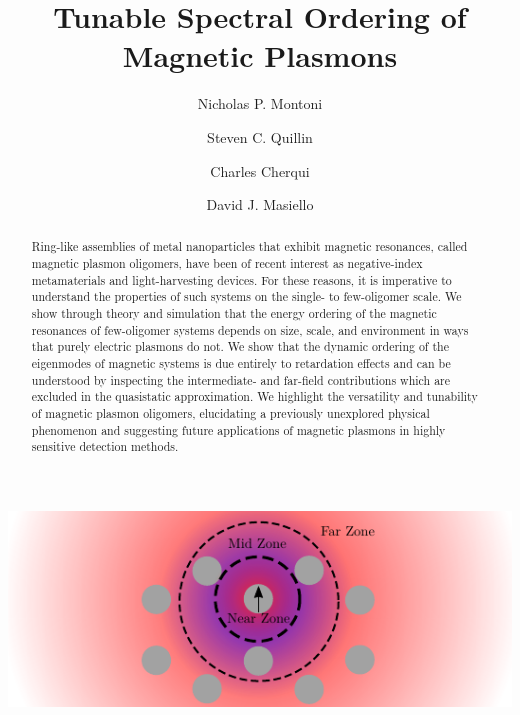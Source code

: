 \documentclass[journal=apchd5,manuscript=article]{achemso}
\author{Nicholas P. Montoni}
\author{Steven C. Quillin}
\author{Charles Cherqui}
\author{David J. Masiello}
\affiliation[Department of Chemistry, University of Washington]
{Department of Chemistry, University of Washington, Seattle, WA 98195}
\title[]
{Tunable Spectral Ordering of Magnetic Plasmons}
\begin{document}
\begin{tocentry}
\includegraphics{toc_graphic.pdf}

\end{tocentry}

\begin{abstract}
Ring-like assemblies of metal nanoparticles that exhibit magnetic resonances, called magnetic plasmon oligomers, have been of recent interest as negative-index metamaterials and light-harvesting devices. For these reasons, it is imperative to understand the properties of such systems on the single- to few-oligomer scale. We show through theory and simulation that the energy ordering of the magnetic resonances of few-oligomer systems depends on size, scale, and environment in ways that purely electric plasmons do not. We show that the dynamic ordering of the eigenmodes of magnetic systems is due entirely to retardation effects and can be understood by inspecting the intermediate- and far-field contributions which are excluded in the quasistatic approximation. We highlight the versatility and tunability of magnetic plasmon oligomers, elucidating a previously unexplored physical phenomenon and suggesting future applications of magnetic plasmons in highly sensitive detection methods. 
\end{abstract}

\end{document}
